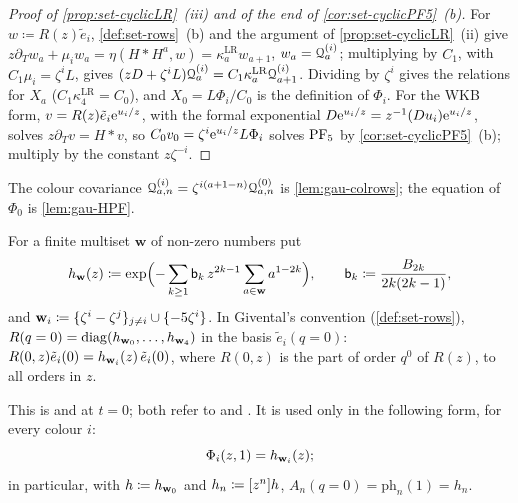 \begin{proof}[Proof of \cref{prop:set-cyclicLR}~(iii) and of the end of \cref{cor:set-cyclicPF5}~(b)]
For $w\coloneqq R(z)\tilde e_i$, \cref{def:set-rows}~(b) and the argument of \cref{prop:set-cyclicLR}~(ii) give $z\partial_Tw_a+\mu_iw_a=\eta(H*H^a,w)=\kappa^{\mathrm{LR}}_aw_{a+1}$, $w_a=\mathcal{Q}^{(i)}_a$; multiplying by $C_1$, with $C_1\mu_i=\zeta^iL$, gives $(zD+\zeta^iL)\mathcal{Q}^{(i)}_a=C_1\kappa^{\mathrm{LR}}_a\mathcal{Q}^{(i)}_{a+1}$. Dividing by $\zeta^i$ gives the relations for $X_a$ ($C_1\kappa^{\mathrm{LR}}_4=C_0$), and $X_0=L\Phi_i/C_0$ is the definition of $\Phi_i$. For the WKB form, $v=R(z)\tilde e_i\mathrm{e}^{u_i/z}$, with the formal exponential $D\mathrm{e}^{u_i/z}=z^{-1}(D u_i)\mathrm{e}^{u_i/z}$, solves $z\partial_Tv=H*v$, so $C_0v_0=\zeta^i\mathrm{e}^{u_i/z}L\Phi_i$ solves $\mathrm{PF}_{5}$ by \cref{cor:set-cyclicPF5}~(b); multiply by the constant $z\zeta^{-i}$.
\end{proof}

The colour covariance $\mathcal{Q}^{(i)}_{a,n}=\zeta^{i(a+1-n)}\mathcal{Q}^{(0)}_{a,n}$ is \cref{lem:gau-colrows}; the equation of $\Phi_0$ is \cref{lem:gau-HPF}.

\begin{thm}[The $R$-matrix at $q=0$, (QRR); quoted]
\label{thm:set-qrr}
For a finite multiset $\mathbf w$ of non-zero numbers put
\begin{equation}
\label{eq:set-hw}
h_{\mathbf{w}}(z)\coloneqq\exp\Bigl(-\sum_{k\geq1}\mathsf{b}_k\,z^{2k-1}\sum_{a\in\mathbf w}a^{1-2k}\Bigr),\qquad\mathsf{b}_k\coloneqq\frac{B_{2k}}{2k(2k-1)},
\end{equation}
and $\mathbf{w}_i\coloneqq\{\zeta^i-\zeta^j\}_{j\neq i}\cup\{-5\zeta^i\}$. In Givental's convention (\cref{def:set-rows}), $R(q=0)=\operatorname{diag}(h_{\mathbf{w}_0},\dots,h_{\mathbf{w}_4})$ in the basis $\tilde e_i(q=0)$: $R(0,z)\tilde e_i(0)=h_{\mathbf{w}_i}(z)\,\tilde e_i(0)$, where $R(0,z)$ is the part of order $q^0$ of $R(z)$, to all orders in $z$.
\end{thm}

This is \cite[proof of Lemma~5.2, (17)]{GJR18} and \cite[proof of Lemma~4.6, (19)--(20)]{GJR17} at $t=0$; both refer to \cite[Section~2.2, Theorem~1 and the Remark after it]{Giv01} and \cite[Theorem~1, Corollary~1]{MR2276766}. It is used only in the following form, for every colour $i$:
\begin{equation}
\label{eq:set-qrr}
\Phi_i(z,1)=h_{\mathbf{w}_i}(z);
\end{equation}
in particular, with $h\coloneqq h_{\mathbf{w}_0}$ and $h_n\coloneqq[z^n]h$, $A_n(q=0)=\mathrm{ph}_n(1)=h_n$.

